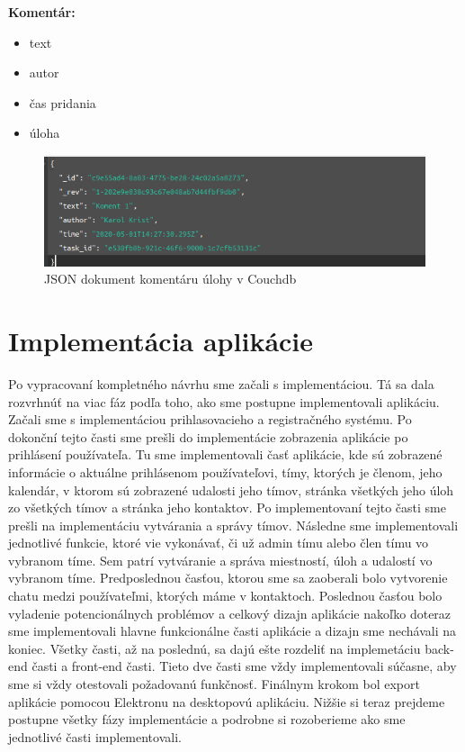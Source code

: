 \textbf{Komentár:}
\indent\begin{itemize}
    \item text
    \item autor
    \item čas pridania
    \item úloha
\end{itemize} 

\begin{figure}[H]
    \centering
    \includegraphics[scale=0.50]{img/imp/db_comment.png}
    \caption{JSON dokument komentáru úlohy v Couchdb}
    \label{fig:db_comment}
\end{figure}

\section{Implementácia aplikácie}
\indent Po vypracovaní kompletného návrhu sme začali s implementáciou. Tá sa dala rozvrhnúť na viac fáz podľa toho, ako sme postupne implementovali aplikáciu. Začali sme s implementáciou prihlasovacieho a registračného systému. Po dokonční tejto časti sme prešli do implementácie zobrazenia aplikácie po prihlásení používateľa. Tu sme implementovali časť aplikácie, kde sú zobrazené informácie o aktuálne prihlásenom používateľovi, tímy, ktorých je členom, jeho kalendár, v ktorom sú zobrazené udalosti jeho tímov, stránka všetkých jeho úloh zo všetkých tímov a stránka jeho kontaktov. Po implementovaní tejto časti sme prešli na implementáciu vytvárania a správy tímov. Následne sme implementovali jednotlivé funkcie, ktoré vie vykonávať, či už admin tímu alebo člen tímu vo vybranom tíme. Sem patrí vytváranie a správa miestností, úloh a udalostí vo vybranom tíme. Predposlednou časťou, ktorou sme sa zaoberali bolo vytvorenie chatu medzi používateľmi, ktorých máme v kontaktoch. Poslednou časťou bolo vyladenie potencionálnych problémov a celkový dizajn aplikácie nakoľko doteraz sme implementovali hlavne funkcionálne časti aplikácie a dizajn sme nechávali na koniec. Všetky časti, až na poslednú, sa dajú ešte rozdeliť na implemetáciu back-end časti a front-end časti. Tieto dve časti sme vždy implementovali súčasne, aby sme si vždy otestovali požadovanú funkčnosť. Finálnym krokom bol export aplikácie pomocou Elektronu na desktopovú aplikáciu. Nižšie si teraz prejdeme postupne všetky fázy implementácie a podrobne si rozoberieme ako sme jednotlivé časti implementovali.

